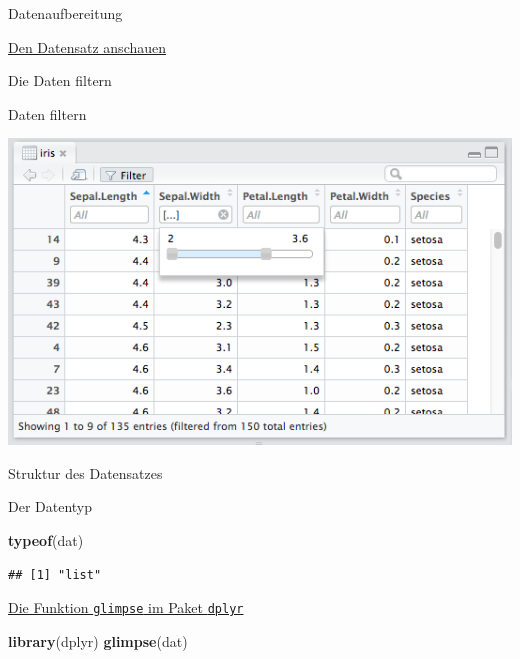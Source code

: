 \documentclass[ignorenonframetext,]{beamer}
\newenvironment{Shaded}{}{}
\newcommand{\KeywordTok}[1]{\textcolor[rgb]{0.00,0.44,0.13}{\textbf{{#1}}}}
\newcommand{\NormalTok}[1]{{#1}}
\begin{document}
\begin{frame}[fragile]{Datenaufbereitung}
\begin{block}{\href{https://support.rstudio.com/hc/en-us/articles/205175388-Using-the-Data-Viewer}{Den
Datensatz anschauen}}
\begin{block}{Die Daten filtern}
\end{block}

\end{block}

\begin{block}{Daten filtern}

\includegraphics{./tex2pdf.9796/35dc4a58b2ab7a9ea8377ea6129b7c5fc8d08014.png}

\end{block}

\begin{block}{Struktur des Datensatzes}

\begin{block}{Der Datentyp}

\begin{Shaded}
\begin{Highlighting}[]
\KeywordTok{typeof}\NormalTok{(dat)}
\end{Highlighting}
\end{Shaded}

\begin{verbatim}
## [1] "list"
\end{verbatim}

\end{block}

\begin{block}{\href{https://stats.stackexchange.com/questions/11551/is-there-a-good-browser-viewer-to-see-an-r-dataset-rda-file}{Die
Funktion \texttt{glimpse} im Paket \texttt{dplyr}}}

\begin{Shaded}
\begin{Highlighting}[]
\KeywordTok{library}\NormalTok{(dplyr)}
\KeywordTok{glimpse}\NormalTok{(dat)}
\end{Highlighting}
\end{Shaded}


\end{block}
\end{block}
\end{frame}
\end{document}
